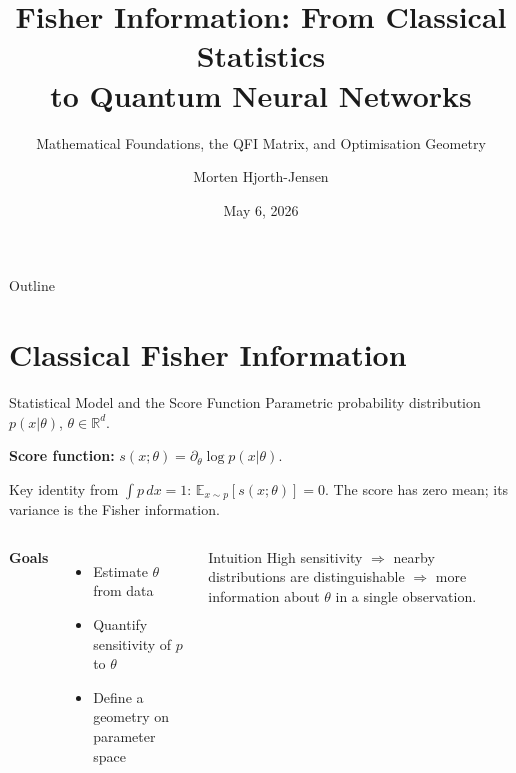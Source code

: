 \documentclass[aspectratio=169,10pt]{beamer}
\title[Fisher Information and QNNs]{%
  Fisher Information: From Classical Statistics\\
  to Quantum Neural Networks}
\subtitle{Mathematical Foundations, the QFI Matrix,
  and Optimisation Geometry}
\author[Graduate Lecture Notes]{Morten Hjorth-Jensen}
\institute{Department of Physics, University of Oslo, Norway}
\date{May 6, 2026}
\newcommand{\E}{\mathbb{E}}
\newcommand{\R}{\mathbb{R}}
\begin{document}

\begin{frame}[plain]\titlepage\end{frame}

\begin{frame}[allowframebreaks]{Outline}
  \scriptsize\tableofcontents[hidesubsections]
\end{frame}

\section{Classical Fisher Information}

\begin{frame}{Statistical Model and the Score Function}
  Parametric probability distribution $p(x|\theta)$,
  $\theta\in\R^d$.

  \medskip
  \textbf{Score function:}
  $s(x;\theta) = \partial_\theta \log p(x|\theta).$

  Key identity from $\int p\,dx=1$:
  $\E_{x\sim p}[s(x;\theta)] = 0.$
  The score has zero mean; its variance is the Fisher information.

  \medskip
  \begin{columns}[T]
    \textbf{Goals}
    \begin{itemize}\itemsep2pt
      \item Estimate $\theta$ from data
      \item Quantify sensitivity of $p$ to $\theta$
      \item Define a geometry on parameter space
    \end{itemize}
    \begin{block}{Intuition}
      \footnotesize
      High sensitivity $\Rightarrow$ nearby distributions
      are distinguishable $\Rightarrow$ more information
      about $\theta$ in a single observation.
    \end{block}
  \end{columns}
\end{frame}
\end{document}
